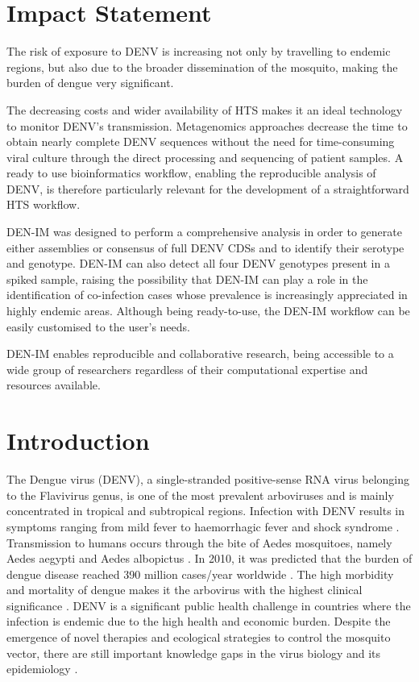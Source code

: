 \section{Impact Statement}
The risk of exposure to DENV is increasing not only by travelling to endemic regions, but also due to the broader dissemination of the mosquito, making the burden of dengue very significant.

The decreasing costs and wider availability of HTS makes it an ideal technology to monitor DENV’s transmission. Metagenomics approaches decrease the time to obtain nearly complete DENV sequences without the need for time-consuming viral culture through the direct processing and sequencing of patient samples. A ready to use bioinformatics workflow, enabling the reproducible analysis of DENV, is therefore particularly relevant for the development of a straightforward HTS workflow.

DEN-IM was designed to perform a comprehensive analysis in order to generate either assemblies or consensus of full DENV CDSs and to identify their serotype and genotype. DEN-IM can also detect all four DENV genotypes present in a spiked sample, raising the possibility that DEN-IM can play a role in the identification of co-infection cases whose prevalence is increasingly appreciated in highly endemic areas. Although being ready-to-use, the DEN-IM workflow can be easily customised to the user’s needs.

DEN-IM enables reproducible and collaborative research, being accessible to a wide group of researchers regardless of their computational expertise and resources available.

\section{Introduction}

The Dengue virus (DENV), a single-stranded positive-sense RNA virus belonging to the Flavivirus genus, is one of the most prevalent arboviruses and is mainly concentrated in tropical and subtropical regions. Infection with DENV results in symptoms ranging from mild fever to haemorrhagic fever and shock syndrome \citep{organization_dengue_2009}. Transmission to humans occurs through the bite of Aedes mosquitoes, namely Aedes aegypti and Aedes albopictus \citep{diamond_molecular_2015}. In 2010, it was predicted that the burden of dengue disease reached 390 million cases/year worldwide \citep{bhatt_global_2013}. The high morbidity and mortality of dengue makes it the arbovirus with the highest clinical significance \citep{lourenco_challenges_2018}. DENV is a significant public health challenge in countries where the infection is endemic due to the high health and economic burden. Despite the emergence of novel therapies and ecological strategies to control the mosquito vector, there are still important knowledge gaps in the virus biology and its epidemiology \citep{diamond_molecular_2015}.

